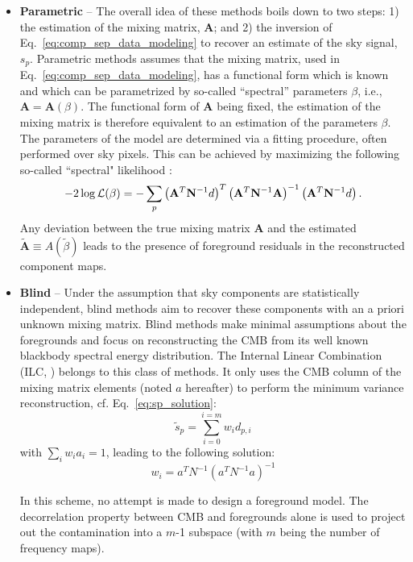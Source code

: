 \begin{itemize}
	\item \textbf{Parametric} -- The overall idea of these methods boils down to two steps: 1) the estimation of the mixing matrix, $\mathbf{A}$; and 2) the inversion of Eq.~\ref{eq:comp_sep_data_modeling} to recover an estimate of the sky signal, $s_p$.
	Parametric methods assumes that the mixing matrix, used in Eq.~\ref{eq:comp_sep_data_modeling}, has a functional form which is known and which can be parametrized by so-called ``spectral'' parameters $\beta$, i.e., $\mathbf{A} = \mathbf{A}(\beta)$. The functional form of $\mathbf{A}$ being fixed, the estimation of the mixing matrix is therefore equivalent to an estimation of the parameters $\beta$. The parameters of the model are determined via a fitting procedure, often performed over sky pixels. This can be achieved by maximizing the following so-called ``spectral" likelihood \cite{Brandt:1994aa,Eriksen:2005dr}:
	\begin{eqnarray}
		\centering
			-2\log \mathcal{L}(\beta) = - \sum_p \left( \mathbf{A}^T\mathbf{N}^{-1} d\right)^T\left( \mathbf{A}^T\mathbf{N}^{-1} \mathbf{A}\right)^{-1}\left( \mathbf{A}^T\mathbf{N}^{-1} d\right).
	\end{eqnarray}
Any deviation between the true mixing matrix $\mathbf{A}$ and the estimated $\mathbf{\tilde A} \equiv A(\tilde \beta)$ leads to the presence of foreground residuals in the reconstructed component maps.
	\item \textbf{Blind} -- Under the  assumption that sky components are statistically independent, blind methods aim to recover these components with an a priori unknown mixing matrix. Blind methods make minimal assumptions about the foregrounds and focus on reconstructing the CMB from its well known blackbody spectral energy distribution. The Internal Linear Combination (ILC, \cite{Tegmark:2003ud}) belongs to this class of methods. It only uses the CMB column of the mixing matrix elements (noted $a$ hereafter) to perform the minimum variance reconstruction, cf. Eq.~\ref{eq:sp_solution}:
\begin{equation}
  \tilde s_p = \sum_{i=0}^{i=m} w_i d_{p,i}
\end{equation}
with $\sum_i  w_i a_i = 1$, leading to the following solution:
\begin{equation}
  w_i = a^T N^{-1} (a^TN^{-1} a)^{-1}
\end{equation}

In this scheme, no attempt is made to design a foreground model. The decorrelation property between CMB and foregrounds alone is used to project out the contamination into a $m$-1 subspace (with $m$ being the number of frequency maps).


\end{itemize}
